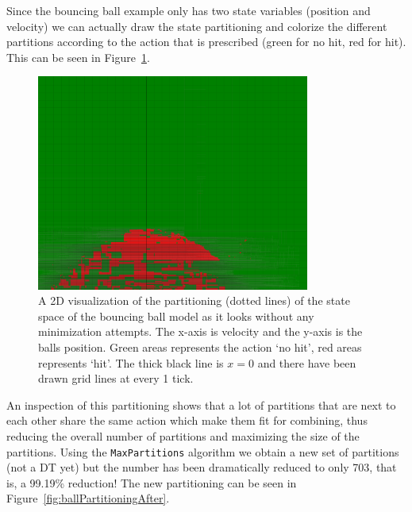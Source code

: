 \documentclass{article}
\begin{document}
Since the bouncing ball example only has two state variables (position and
velocity) we can actually draw the state partitioning and colorize the different
partitions according to the action that is prescribed (green for no hit, red for
hit). This can be seen in Figure~\ref{fig:ballPartitioningBefore}.

\begin{figure}[ht]
    \centering
    \includegraphics[width=0.8\textwidth]{ballPartitioningBefore}
    \caption{%
        A 2D visualization of the partitioning (dotted lines) of the state space
        of the bouncing ball model as it looks without any minimization
        attempts. The x-axis is velocity and the y-axis is the balls position.
        Green areas represents the action `no hit', red areas represents `hit'.
        The thick black line is $x=0$ and there have been drawn grid lines at
        every 1 tick.
    }\label{fig:ballPartitioningBefore}
\end{figure}

An inspection of this partitioning shows that a lot of partitions that are next
to each other share the same action which make them fit for combining, thus
reducing the overall number of partitions and maximizing the size of the
partitions. Using the \texttt{MaxPartitions} algorithm we obtain a new set of
partitions (not a DT yet) but the number has been dramatically reduced to only
703, that is, a 99.19\% reduction! The new partitioning can be seen in
Figure~\ref{fig:ballPartitioningAfter}.
\end{document}
